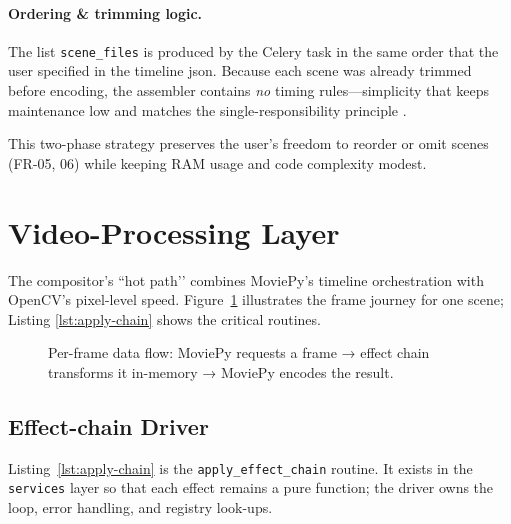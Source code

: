 \paragraph{Ordering \& trimming logic.}
The list \texttt{scene\_files} is produced by the Celery task in the same
order that the user specified in the timeline \gls{json}.
Because each scene was already trimmed before encoding, the assembler
contains \emph{no} timing rules—simplicity that keeps maintenance low and
matches the single-responsibility principle \cite{martinSRP}.


This two-phase strategy preserves the user’s freedom to reorder or omit
scenes (FR-05, 06) while keeping RAM usage and code complexity modest.

\section{Video-Processing Layer}
\label{sec:impl-video}

The compositor’s “hot path’’ combines MoviePy’s timeline orchestration with
OpenCV’s pixel-level speed.  Figure~\ref{fig:video-path} illustrates the frame
journey for one scene; Listing \ref{lst:apply-chain}
shows the critical routines.

\begin{figure}[htbp]
  \centering
  \fbox{\rule{0pt}{5.0cm}\rule{0.85\linewidth}{0pt}}
  \caption{Per-frame data flow: MoviePy requests a frame → effect chain
           transforms it in-memory → MoviePy encodes the result.}
  \label{fig:video-path}
\end{figure}

\subsection{Effect-chain Driver}
\label{sec:apply-chain}

Listing~\ref{lst:apply-chain} is the \texttt{apply\_effect\_chain} routine.
It exists in the \texttt{services} layer so that each effect remains a pure
function; the driver owns the loop, error handling, and registry look-ups.

